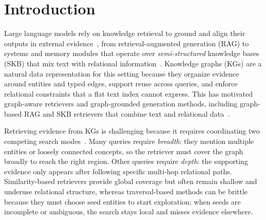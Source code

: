 
\section{Introduction}
Large language models rely on knowledge retrieval to ground and align their outputs in external evidence~\cite{ren2025investigating,wang2025survey,xia2025ground,zhang2024knowledge}, from retrieval-augmented generation (RAG) to systems and memory modules that operate over \emph{semi-structured} knowledge bases (SKB) that mix text with relational information~\cite{lewis_retrieval-augmented_2020,guu_realm_2020,karpukhin_dense_2020,izacard_leveraging_2021,mavromatis_gnn-rag_2025,chen_gril_2025,li2025retrollm}. Knowledge graphs (KGs) are a natural data representation for this setting because they organize evidence around entities and typed edges, support reuse across queries, and enforce relational constraints that a flat text index cannot express. This has motivated graph-aware retrievers and graph-grounded generation methods, including graph-based RAG and SKB retrievers that combine text and relational data~\cite{edge_local_2025,zhu_knowledge_2025,xia_knowledge-aware_2025, yao2025expandr,jeong2025database}.

Retrieving evidence from KGs is challenging because it requires coordinating two competing search modes~\cite{wu_stark_2024,lee_hybgrag_2025,zhu-etal-2025-mitigating,yan2026explore}. Many queries require \emph{breadth}: they mention multiple entities or loosely connected concepts, so the retriever must cover the graph broadly to reach the right region. Other queries require \emph{depth}: the supporting evidence only appears after following specific multi-hop relational paths. Similarity-based retrievers provide global coverage but often remain shallow and underuse relational structure, whereas traversal-based methods can be brittle because they must choose seed entities to start exploration; when seeds are incomplete or ambiguous, the search stays local and misses evidence elsewhere.

